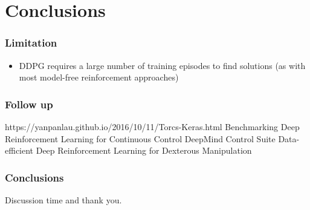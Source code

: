 \section{Conclusions}

\begin{frame}
\frametitle{Limitation}
\begin{itemize}
  \item DDPG requires a large number of training episodes to find solutions
  (as with most model-free reinforcement approaches)
\end{itemize}
\end{frame}

\begin{frame}
\frametitle{Follow up}
https://yanpanlau.github.io/2016/10/11/Torcs-Keras.html
Benchmarking Deep Reinforcement Learning for Continuous Control
DeepMind Control Suite
Data-efficient Deep Reinforcement Learning for Dexterous Manipulation
\end{frame}

\begin{frame}
\frametitle{Conclusions}

\end{frame}

\begin{frame}
\Huge{\centerline{Discussion time and thank you.}}
\end{frame}
